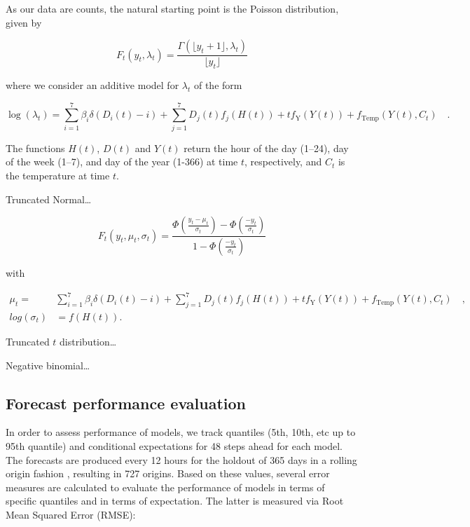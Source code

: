 \documentclass[]{elsarticle} %
\begin{document}
As our data are counts, the natural starting point is the Poisson distribution, given by

\begin{equation}
  F_t(y_t,\lambda_t) =  \frac{\Gamma(\lfloor y_t + 1  \rfloor,\lambda_t)}{\lfloor y_t \rfloor}
  \label{eq:poissonreg}
\end{equation}

where we consider an additive model for \(\lambda_t\) of the form

\begin{equation}
  \log(\lambda_t) = \sum_{i=1}^7 \beta_i \delta(D_i(t)-i) + \sum_{j=1}^7 D_j(t) f_j(H(t)) + t f_\text{Y}(Y(t)) + f_\text{Temp}(Y(t),C_t) \quad .
 \label{eq:additivemodel}
\end{equation}

The functions \(H(t)\), \(D(t)\) and \(Y(t)\) return the hour of the day (1--24), day of the week (1--7), and day of the year (1-366) at time \(t\), respectively, and \(C_t\) is the temperature at time \(t\).

Truncated Normal\ldots{}

\begin{equation}
  F_t(y_t,\mu_t,\sigma_t) =  \frac{\Phi\left( \frac{y_t-\mu_t}{\sigma_t} \right) - \Phi\left( \frac{-y_t}{\sigma_t} \right)}{1 - \Phi\left( \frac{-y_t}{\sigma_t} \right)}
 \label{eq:truncatedn}
\end{equation}

with

\begin{align*}
  \mu_t = &  \sum_{i=1}^7 \beta_i \delta(D_i(t)-i) + \sum_{j=1}^7 D_j(t) f_j(H(t)) + t f_\text{Y}(Y(t)) + f_\text{Temp}(Y(t),C_t) \quad, \\
  log(\sigma_t) & = f(H(t)) .
\end{align*}

Truncated \(t\) distribution\ldots{}

Negative binomial\ldots{}

\hypertarget{accuracy}{%
\subsection{Forecast performance evaluation}\label{accuracy}}

In order to assess performance of models, we track quantiles (5th, 10th, etc up to 95th quantile) and conditional expectations for 48 steps ahead for each model. The forecasts are produced every 12 hours for the holdout of 365 days in a rolling origin fashion \citep{Tashman2000}, resulting in 727 origins. Based on these values, several error measures are calculated to evaluate the performance of models in terms of specific quantiles and in terms of expectation. The latter is measured via Root Mean Squared Error (RMSE):
\end{document}
